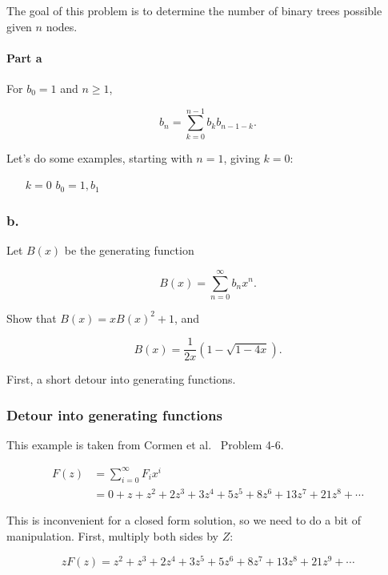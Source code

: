 \documentclass{article}
\begin{document}
The goal of this problem is to determine the number of binary
trees possible given $n$ nodes.

\paragraph{Part a} For $b_0 = 1$ and $n \geq 1$,

\[
b_n = \sum_{k=0}^{n-1} b_kb_{n-1-k}.
\]

Let's do some examples, starting with $n = 1$, giving $k = 0$:

\begin{itemize}
\item [$k=0$] $b_0 = 1, b_1$
\end{itemize}

\subsubsection{b.} Let $B(x)$ be the generating function

\begin{equation}
B(x) = \sum_{n=0}^{\infty}b_nx^n.
\end{equation}

Show that $B(x) = xB(x)^2 + 1$, and

\begin{equation}
B(x) = \frac{1}{2x}(1-\sqrt{1-4x}).
\end{equation}


First, a short detour into generating functions.

\subsubsection{Detour into generating functions}

This example is taken from Cormen et al.~\cite[p. 74]{cormen:th:1990}
Problem 4-6.

\begin{align}
F(z) & = \sum_{i=0}^{\infty} F_ix^i\\
\label{eqn:fibonacci_opsgf}
     & = 0 + z + z^2 + 2z^3 + 3z^4 + 5z^5 + 8z^6 + 13z^7 + 21z^8+\cdots
\end{align}

This is inconvenient for a closed form solution, so we need to do a bit of
manipulation. First, multiply both sides by $Z$:

\begin{equation}
\label{eqn:zfibonacci_opsgf}
zF(z) = z^2 + z^3 + 2z^4 + 3z^5 + 5z^6 + 8z^7 + 13z^8 + 21z^9+\cdots
\end{equation}
\end{document}
